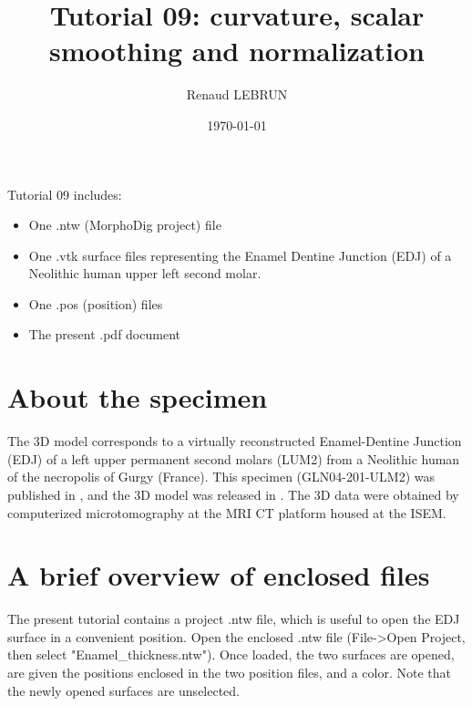 \documentclass[12pt, a4paper]{book}
\title{Tutorial 09: curvature, scalar smoothing and normalization}
\author{Renaud LEBRUN}
\affil{Institut des Sciences de l'Evolution, Université de Montpellier, France}
\date{\today}
\begin{document}
	\dominitoc

\maketitle


\faketableofcontents



\minitoc 
Tutorial 09 includes:
\begin{itemize}
\item One .ntw (MorphoDig project) file
\item One .vtk surface files representing the Enamel Dentine Junction (EDJ) of a Neolithic human upper left second molar.
\item One .pos (position) files 
\item The present .pdf document
\end{itemize}



\section{About the specimen}
The 3D model corresponds to a virtually reconstructed Enamel-Dentine Junction (EDJ) of a left upper permanent second molars (LUM2) from a Neolithic human of the necropolis of Gurgy (France). This specimen (GLN04-201-ULM2) was published in \citet{LeLuyer2016}, and the 3D model was released in \citet{LeLuyer2016a}.
The 3D data were obtained by computerized microtomography at the MRI \si{\micro}CT platform housed at the ISEM. 


\section{A brief overview of enclosed files}
		
The present tutorial contains a project .ntw file, which is useful to open the EDJ surface in a convenient position. Open the enclosed .ntw file (File->Open Project, then select "Enamel\_thickness.ntw"). Once loaded, the two surfaces are opened, are given the positions enclosed in the two position files, and a color. Note that the newly opened surfaces are unselected.
\end{document}

